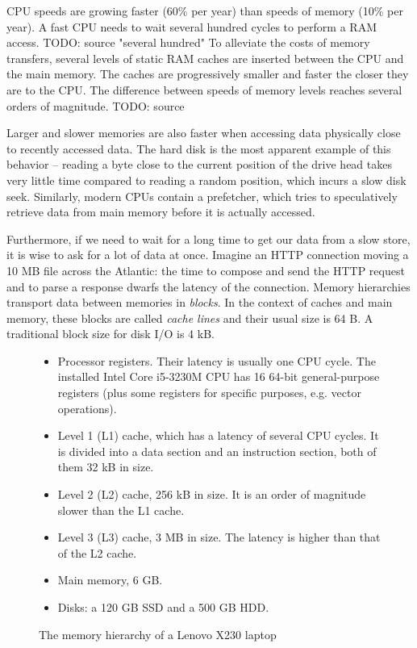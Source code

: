 CPU speeds are growing faster (60\% per year) than speeds of memory (10\% per
year)\cite{ailamaki05}. A fast CPU needs to wait several hundred cycles
to perform a RAM access. TODO: source "several hundred"
To alleviate the costs of memory transfers, several levels of static RAM
caches are inserted between the CPU and the main memory. The caches are
progressively smaller and faster the closer they are to the CPU. The difference
between speeds of memory levels reaches several orders of magnitude. TODO: source

Larger and slower memories are also faster when accessing data physically
close to recently accessed data. The hard disk is the most apparent example
of this behavior -- reading a byte close to the current position of the drive
head takes very little time compared to reading a random position, which incurs
a slow disk seek. %
Similarly, modern CPUs contain a prefetcher, which tries to speculatively
retrieve data from main memory before it is actually accessed.

Furthermore, if we need to wait for a long time to get our data from a slow
store, it is wise to ask for a lot of data at once. Imagine an HTTP connection
moving a 10 MB file across the Atlantic: the time to compose and send the HTTP
request and to parse a response dwarfs the latency of the connection.
Memory hierarchies transport data between memories in \textit{blocks}.
In the context of caches and main memory, these blocks are called
\textit{cache lines} and their usual size is 64 B.
A traditional block size for disk I/O is 4 kB.

\begin{figure}
\begin{itemize}
\item Processor registers. Their latency is usually one CPU cycle.
	The installed Intel Core i5-3230M CPU has 16 64-bit general-purpose
	registers (plus some registers for specific purposes, e.g. vector
	operations).
\item Level 1 (L1) cache, which has a latency of several CPU cycles.
	It is divided into a data section and an instruction section,
	both of them 32 kB in size.
\item Level 2 (L2) cache, 256 kB in size.
	It is an order of magnitude slower than the L1 cache.
\item Level 3 (L3) cache, 3 MB in size.
	The latency is higher than that of the L2 cache.
\item Main memory, 6 GB.
\item Disks: a 120 GB SSD and a 500 GB HDD.
\end{itemize}
\caption{The memory hierarchy of a Lenovo X230 laptop}
\end{figure}

